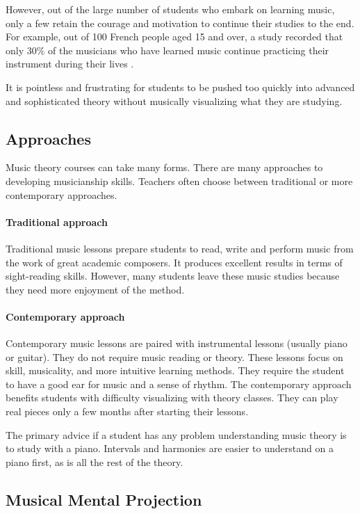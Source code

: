 However, out of the large number of students who embark on learning music, only a few retain the courage and motivation to continue their studies to the end.
For example, out of 100 French people aged 15 and over, a study recorded that only 30\% of the musicians who have learned music continue practicing their instrument during their lives \cite{amateurs}.

It is pointless and frustrating for students to be pushed too quickly into advanced and sophisticated theory without musically visualizing what they are studying.

\subsection{Approaches}

Music theory courses can take many forms. There are many approaches to developing musicianship skills. Teachers often choose between traditional or more contemporary approaches.

\paragraph*{Traditional approach}

Traditional music lessons prepare students to read, write and perform music from the work of great academic composers. It produces excellent results in terms of sight-reading skills. However, many students leave these music studies because they need more enjoyment of the method.


\paragraph*{Contemporary approach}
Contemporary music lessons are paired with instrumental lessons (usually piano or guitar). They do not require music reading or theory. These lessons focus on skill, musicality, and more intuitive learning methods. They require the student to have a good ear for music and a sense of rhythm. The contemporary approach benefits students with difficulty visualizing with theory classes. They can play real pieces only a few months after starting their lessons. 


The primary advice if a student has any problem understanding music theory is to study with a piano. Intervals and harmonies are easier to understand on a piano first, as is all the rest of the theory.

\subsection{Musical Mental Projection}

